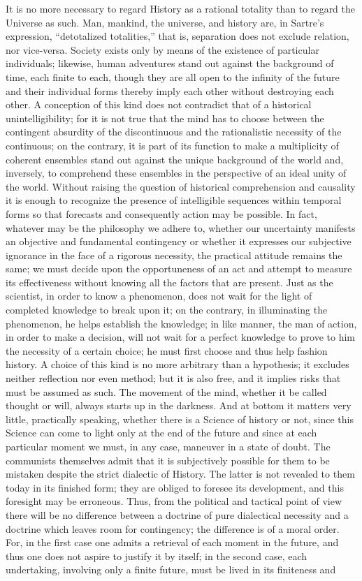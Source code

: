 \documentclass[11pt]{article}
\begin{document}
{{It is no more necessary to regard History as a rational totality than to regard the Universe as such. Man, mankind, the universe, and history are, in Sartre’s expression, “detotalized totalities,” that is, separation does not exclude relation, nor vice-versa. Society exists only by means of the existence of particular individuals; likewise, human adventures stand out against the background of time, each finite to each, though they are all open to the infinity of the future and their individual forms thereby imply each other without destroying each other. A conception of this kind does not contradict that of a historical unintelligibility; for it is not true that the mind has to choose between the contingent absurdity of the discontinuous and the rationalistic necessity of the continuous; on the contrary, it is part of its function to make a multiplicity of coherent ensembles stand out against the unique background of the world and, inversely, to comprehend these ensembles in the perspective of an ideal unity of the world. Without raising the question of historical comprehension and causality it is enough to recognize the presence of intelligible sequences within temporal forms so that forecasts and consequently action may be possible. In fact, whatever may be the philosophy we adhere to, whether our uncertainty manifests an objective and fundamental contingency or whether it expresses our subjective ignorance in the face of a rigorous necessity, the practical attitude remains the same; we must decide upon the opportuneness of an act and attempt to measure its effectiveness without knowing all the factors that are present. Just as the scientist, in order to know a phenomenon, does not wait for the light of completed knowledge to break upon it; on the contrary, in illuminating the phenomenon, he helps establish the knowledge; in like manner, the man of action, in order to make a decision, will not wait for a perfect knowledge to prove to him the necessity of a certain choice; he must first choose and thus help fashion history. A choice of this kind is no more arbitrary than a hypothesis; it excludes neither reflection nor even method; but it is also free, and it implies risks that must be assumed as such. The movement of the mind, whether it be called thought or will, always starts up in the darkness. And at bottom it matters very little, practically speaking, whether there is a Science of history or not, since this Science can come to light only at the end of the future and since at each particular moment we must, in any case, maneuver in a state of doubt. The communists themselves admit that it is subjectively possible for them to be mistaken despite the strict dialectic of History. The latter is not revealed to them today in its finished form; they are obliged to foresee its development, and this foresight may be erroneous. Thus, from the political and tactical point of view there will be no difference between a doctrine of pure dialectical necessity and a doctrine which leaves room for contingency; the difference is of a moral order. For, in the first case one admits a retrieval of each moment in the future, and thus one does not aspire to justify it by itself; in the second case, each undertaking, involving only a finite future, must be lived in its finiteness and }}
\end{document}
